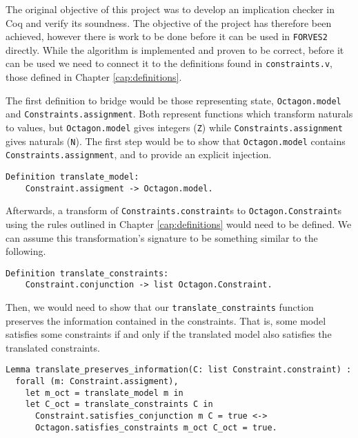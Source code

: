 The original objective of this project was to develop an implication checker in Coq
and verify its soundness. The objective of the project has therefore been achieved,
however there is work to be done before it can be used in \verb|FORVES2| directly.
While the algorithm is implemented and proven to be correct, before it can be used
we need to connect it to the definitions found in \texttt{constraints.v},
those defined in Chapter \ref{cap:definitions}.

The first definition to bridge would be those representing state, \texttt{Octagon.model} 
and \texttt{Constraints.assignment}. Both represent functions which transform naturals
to values, but \texttt{Octagon.model} gives integers (\texttt{Z}) while
\texttt{Constraints.assignment} gives naturals (\texttt{N}). The first
step would be to show that \texttt{Octagon.model} contains 
\texttt{Constraints.assignment}, and to provide an explicit injection.
\begin{verbatim}
Definition translate_model:
    Constraint.assigment -> Octagon.model.
\end{verbatim}

Afterwards, a transform of \texttt{Constraints.constraint}s to 
\texttt{Octagon.Constraint}s using the rules outlined in Chapter 
\ref{cap:definitions} would need to be defined. We can assume this transformation's
signature to be something similar to the following.
\begin{verbatim}
Definition translate_constraints: 
    Constraint.conjunction -> list Octagon.Constraint.
\end{verbatim}

\noindent Then, we would need to show that our \texttt{translate_constraints} function
preserves the information contained in the constraints. That is, some model satisfies some 
constraints if and only if the translated model also satisfies the translated constraints.

\begin{verbatim}
Lemma translate_preserves_information(C: list Constraint.constraint) :
  forall (m: Constraint.assigment),
    let m_oct = translate_model m in
    let C_oct = translate_constraints C in
      Constraint.satisfies_conjunction m C = true <->
      Octagon.satisfies_constraints m_oct C_oct = true.
\end{verbatim}

